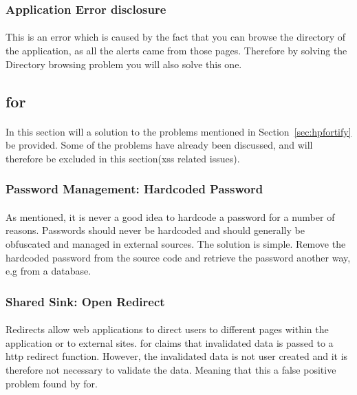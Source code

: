 \documentclass[11pt,english,a4paper]{report}
\begin{document}
\subsubsection{Application Error disclosure}
\paragraph{}
This is an error which is caused by the fact that you can browse the directory of the application, as all the alerts came from those pages.
Therefore by solving the Directory browsing problem you will also solve this one.

\subsection{\gls{for}}
\paragraph{}
In this section will a solution to the problems mentioned in Section~\ref{sec:hpfortify} be provided.
Some of the problems have already been discussed, and will therefore be excluded in this section(\gls{xss} related issues). 

\subsubsection{Password Management: Hardcoded Password}
\label{passwordmanagement}
\paragraph{}
As mentioned, it is never a good idea to hardcode a password for a number of reasons.
Passwords should never be hardcoded and should generally be obfuscated and managed in external sources. 
The solution is simple.
Remove the hardcoded password from the source code and retrieve the password another way, e.g from a database.

\subsubsection{Shared Sink: Open Redirect}
\paragraph{}
Redirects allow web applications to direct users to different pages within the application or to external sites. 
\gls{for} claims that invalidated data is passed to a \gls{http} redirect function.
However, the invalidated data is not user created and it is therefore not necessary to validate the data.
Meaning that this a false positive problem found by \gls{for}. 
\end{document}
